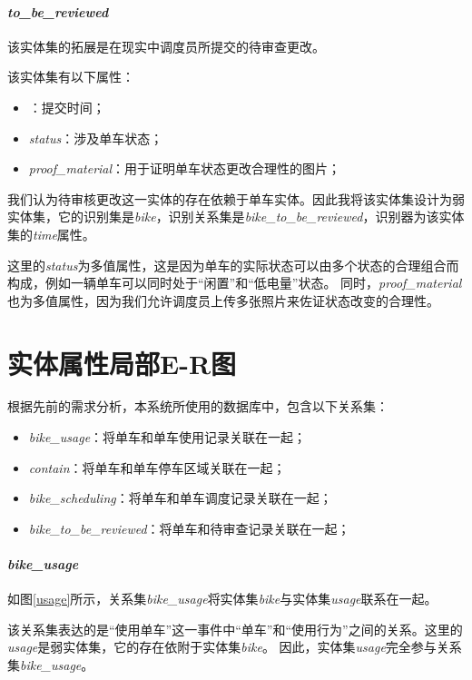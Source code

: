 \paragraph{\textit{to\_be\_reviewed}}

该实体集的拓展是在现实中调度员所提交的待审查更改。

该实体集有以下属性：
\begin{itemize}
  \item \textit{}：提交时间；
  \item \textit{status}：涉及单车状态；
  \item \textit{proof\_material}：用于证明单车状态更改合理性的图片；
\end{itemize}

我们认为待审核更改这一实体的存在依赖于单车实体。因此我将该实体集设计为弱实体集，它的识别集是\textit{bike}，识别关系集是\textit{bike\_to\_be\_reviewed}，识别器为该实体集的\textit{time}属性。

这里的\textit{status}为多值属性，这是因为单车的实际状态可以由多个状态的合理组合而构成，例如一辆单车可以同时处于“闲置”和“低电量”状态。
同时，\textit{proof\_material}也为多值属性，因为我们允许调度员上传多张照片来佐证状态改变的合理性。

\section{实体属性局部E-R图}

根据先前的需求分析，本系统所使用的数据库中，包含以下关系集：
\begin{itemize}
  \item \textit{bike\_usage}：将单车和单车使用记录关联在一起；
  \item \textit{contain}：将单车和单车停车区域关联在一起；
  \item \textit{bike\_scheduling}：将单车和单车调度记录关联在一起；
  \item \textit{bike\_to\_be\_reviewed}：将单车和待审查记录关联在一起；
\end{itemize}

\paragraph{\textit{bike\_usage}}
如图\ref{usage}所示，关系集\textit{bike\_usage}将实体集\textit{bike}与实体集\textit{usage}联系在一起。

该关系集表达的是“使用单车”这一事件中“单车”和“使用行为”之间的关系。这里的\textit{usage}是弱实体集，它的存在依附于实体集\textit{bike}。
因此，实体集\textit{usage}完全参与关系集\textit{bike\_usage}。

